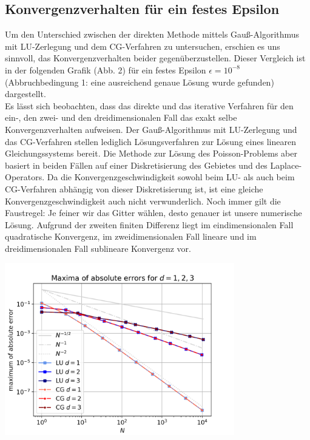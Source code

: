 \documentclass{scrartcl}
\begin{document}
\subsection{Konvergenzverhalten für ein festes Epsilon}
Um den Unterschied zwischen der direkten Methode mittels Gauß-Algorithmus mit LU-Zerlegung und dem CG-Verfahren zu untersuchen, erschien es uns sinnvoll, das Konvergenzverhalten beider gegenüberzustellen. 
Dieser Vergleich ist in der folgenden Grafik (Abb. 2) für ein festes Epsilon $\epsilon = 10^{-8}$ (Abbruchbedingung 1: eine ausreichend genaue Lösung wurde gefunden) dargestellt. \\
Es lässt sich beobachten, dass das direkte und das iterative Verfahren für den ein-, den zwei- und den dreidimensionalen Fall das exakt selbe Konvergenzverhalten aufweisen. 
Der Gauß-Algorithmus mit LU-Zerlegung und das CG-Verfahren stellen lediglich Lösungsverfahren zur Lösung eines linearen Gleichungssystems bereit. 
Die Methode zur Lösung des Poisson-Problems aber basiert in beiden Fällen auf einer Diskretisierung des Gebietes und des Laplace-Operators. 
Da die Konvergenzgeschwindigkeit sowohl beim LU- als auch beim CG-Verfahren abhängig von dieser Diskretisierung ist, ist eine gleiche Konvergenzgeschwindigkeit auch nicht verwunderlich. 
Noch immer gilt die Faustregel: Je feiner wir das Gitter wählen, desto genauer ist unsere numerische Lösung. 
Aufgrund der zweiten finiten Differenz liegt im eindimensionalen Fall quadratische Konvergenz, im zweidimensionalen Fall lineare und im dreidimensionalen Fall sublineare Konvergenz vor. 


{
  \centering
    \includegraphics[width=0.75\textwidth]{Grafiken/compare}
    \vspace{-0.2cm}
}
\vspace{0.5cm}
\end{document}

